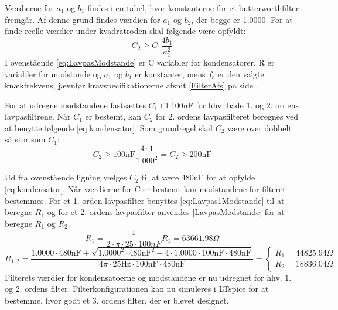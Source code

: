 \noindent Værdierne for $a_{1}$ og $b_{1}$ findes i en tabel, hvor konstanterne for et butterworthfilter fremgår. Af denne grund findes værdien for $a_{1}$  og  $b_{2}$, der begge er 1.0000. For at finde reelle værdier under kvadratroden skal følgende være opfyldt:
\begin{equation} \label{eq:kondensator}
C_2 \geq C_1 \frac{4b_1}{a_1^2}
\end{equation}
I ovenstående \eqref{eq:LavpasModstande} er C variabler for kondensatorer, R er variabler for modstande og $a_1$ og $b_1$ er konstanter, mens $f_c$ er den valgte knækfrekvens, jævnfør kravspecifikationerne afsnit \ref{FilterAfs} på side \pageref{FilterAfs}. 

\noindent For at udregne modstandene fastsættes $C_1$ til 100nF for hhv. både 1. og 2. ordens lavpasfiltrene. Når $C_1$ er bestemt, kan $C_2$ for 2. ordens lavpasfilteret beregnes ved at benytte følgende \eqref{eq:kondensator}. Som grundregel skal $C_2$ være over dobbelt så stor som $C_1$:
\begin{equation}  
C_2 \geq 100\text{nF} \frac{4\cdot 1}{1.000^2} = C_2 \geq 200\text{nF}
\end{equation}

\noindent Ud fra ovenstående ligning vælges $C_2$ til at være 480nF for at opfylde \eqref{eq:kondensator}. Når værdierne for C er bestemt kan modstandene for filteret bestemmes. For et 1. orden lavpasfilter benyttes \eqref{eq:Lavpas1Modstande} til at beregne $R_1$ og for et 2. ordens lavpasfilter anvendes \eqref{LavpasModstande} for at beregne $R_1$ og $R_2$. 
\begin{equation} \label{eq:1ordenmodstand}
R_{1} = \frac{1}{2 \cdot \pi \cdot 25 \cdot 100nF} R_{1} = 63661.98 \Omega
\end{equation}
\begin{equation} \label{eq:2ordenmodstand}
R_{1,2} = \frac{1.0000 \cdot 480\text{nF} \pm \sqrt{1.0000^2 \cdot 480\text{nF}^2 - 4 \cdot 1.0000 \cdot 100\text{nF} \cdot 480\text{nF}}}{4 \pi \cdot 25\text{Hz} \cdot 100\text{nF} \cdot 480\text{nF}} = \begin{cases} R_{1} =  44825.94\Omega \\ R_{2} = 18836.04 \Omega \end{cases}
\end{equation}
\noindent Filterets værdier for kondensatoerne og modstandene er nu udregnet for hhv. 1. og 2. ordens filter. Filterkonfigurationen kan nu simuleres i LTspice for at bestemme, hvor godt et 3. ordens filter, der er blevet designet.

